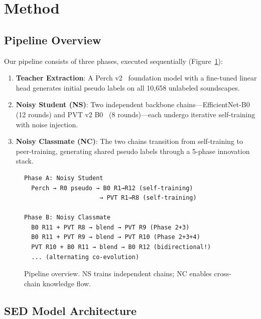 \documentclass[a4paper]{article}
\begin{document}
\section{Method}
\label{sec:method}

\subsection{Pipeline Overview}

Our pipeline consists of three phases, executed sequentially (Figure~\ref{fig:pipeline}):

\begin{enumerate}[nosep]
    \item \textbf{Teacher Extraction}: A Perch v2~\citep{perch2024} foundation model with a fine-tuned linear head generates initial pseudo labels on all 10,658 unlabeled soundscapes.
    \item \textbf{Noisy Student (NS)}: Two independent backbone chains---EfficientNet-B0~\citep{tan2019efficientnet} (12 rounds) and PVT v2 B0~\citep{wang2022pvt} (8 rounds)---each undergo iterative self-training with noise injection.
    \item \textbf{Noisy Classmate (NC)}: The two chains transition from self-training to peer-training, generating shared pseudo labels through a 5-phase innovation stack.
\end{enumerate}

\begin{figure}[t]
\centering
\small
\begin{verbatim}
Phase A: Noisy Student
  Perch → R0 pseudo → B0 R1→R12 (self-training)
                     → PVT R1→R8 (self-training)

Phase B: Noisy Classmate
  B0 R11 + PVT R8 → blend → PVT R9 (Phase 2+3)
  B0 R11 + PVT R9 → blend → PVT R10 (Phase 2+3+4)
  PVT R10 + B0 R11 → blend → B0 R12 (bidirectional!)
  ... (alternating co-evolution)
\end{verbatim}
\caption{Pipeline overview. NS trains independent chains; NC enables cross-chain knowledge flow.}
\label{fig:pipeline}
\end{figure}

\subsection{SED Model Architecture}
\end{document}
